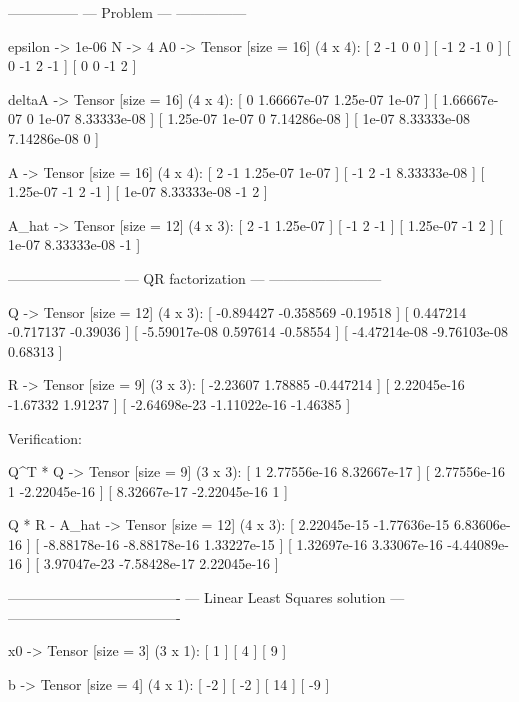 \documentclass[a4paper,14pt]{extarticle}
\newenvironment{tinyverbatim}%
{\footnotesize\verbatim}%
{\endverbatim}
\begin{document}
\begin{tinyverbatim}
---------------
--- Problem ---
---------------

epsilon -> 1e-06
N       -> 4
A0      -> Tensor [size = 16] (4 x 4):
  [  2 -1  0  0 ]
  [ -1  2 -1  0 ]
  [  0 -1  2 -1 ]
  [  0  0 -1  2 ]

deltaA  -> Tensor [size = 16] (4 x 4):
  [           0 1.66667e-07    1.25e-07       1e-07 ]
  [ 1.66667e-07           0       1e-07 8.33333e-08 ]
  [    1.25e-07       1e-07           0 7.14286e-08 ]
  [       1e-07 8.33333e-08 7.14286e-08           0 ]

A       -> Tensor [size = 16] (4 x 4):
  [        2          -1 1.25e-07       1e-07 ]
  [       -1           2       -1 8.33333e-08 ]
  [ 1.25e-07          -1        2          -1 ]
  [    1e-07 8.33333e-08       -1           2 ]

A_hat   -> Tensor [size = 12] (4 x 3):
  [        2          -1 1.25e-07 ]
  [       -1           2       -1 ]
  [ 1.25e-07          -1        2 ]
  [    1e-07 8.33333e-08       -1 ]

------------------------
--- QR factorization ---
------------------------

Q             -> Tensor [size = 12] (4 x 3):
  [    -0.894427    -0.358569 -0.19518 ]
  [     0.447214    -0.717137 -0.39036 ]
  [ -5.59017e-08     0.597614 -0.58554 ]
  [ -4.47214e-08 -9.76103e-08  0.68313 ]

R             -> Tensor [size = 9] (3 x 3):
  [     -2.23607      1.78885 -0.447214 ]
  [  2.22045e-16     -1.67332   1.91237 ]
  [ -2.64698e-23 -1.11022e-16  -1.46385 ]

Verification:

Q^T * Q       -> Tensor [size = 9] (3 x 3):
  [           1  2.77556e-16  8.32667e-17 ]
  [ 2.77556e-16            1 -2.22045e-16 ]
  [ 8.32667e-17 -2.22045e-16            1 ]

Q * R - A_hat -> Tensor [size = 12] (4 x 3):
  [  2.22045e-15 -1.77636e-15  6.83606e-16 ]
  [ -8.88178e-16 -8.88178e-16  1.33227e-15 ]
  [  1.32697e-16  3.33067e-16 -4.44089e-16 ]
  [  3.97047e-23 -7.58428e-17  2.22045e-16 ]

-------------------------------------
--- Linear Least Squares solution ---
-------------------------------------

x0                 -> Tensor [size = 3] (3 x 1):
  [ 1 ]
  [ 4 ]
  [ 9 ]

b                  -> Tensor [size = 4] (4 x 1):
  [ -2 ]
  [ -2 ]
  [ 14 ]
  [ -9 ]


\end{tinyverbatim}
\end{document}
